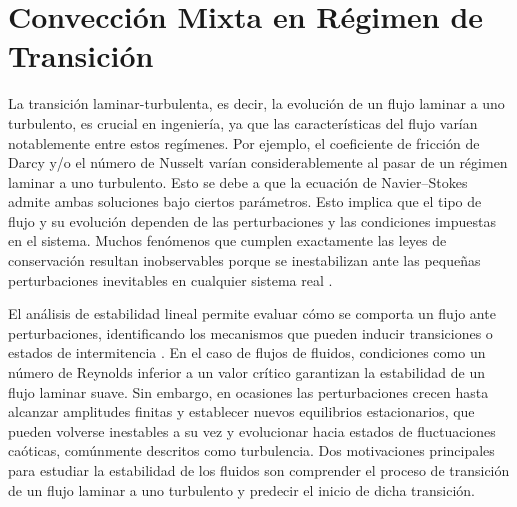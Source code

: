 \chapter{Convección Mixta en Régimen de Transición}




\newpage







La transición laminar-turbulenta, es decir, la evolución de un flujo laminar a uno turbulento, es crucial en ingeniería, ya que las características del flujo varían notablemente entre estos regímenes. Por ejemplo, el coeficiente de fricción de Darcy y/o el número de Nusselt varían considerablemente al pasar de un régimen laminar a uno turbulento. Esto se debe a que la ecuación de Navier–Stokes admite ambas soluciones bajo ciertos parámetros. Esto implica que el tipo de flujo y su evolución dependen de las perturbaciones y las condiciones impuestas en el sistema. Muchos fenómenos que cumplen exactamente las leyes de conservación resultan inobservables porque se inestabilizan ante las pequeñas perturbaciones inevitables en cualquier sistema real \cite{kundu}.

El análisis de estabilidad lineal permite evaluar cómo se comporta un flujo ante perturbaciones, identificando los mecanismos que pueden inducir transiciones o estados de intermitencia \cite{schmid}. En el caso de flujos de fluidos, condiciones como un número de Reynolds inferior a un valor crítico garantizan la estabilidad de un flujo laminar suave. Sin embargo, en ocasiones las perturbaciones crecen hasta alcanzar amplitudes finitas y establecer nuevos equilibrios estacionarios, que pueden volverse inestables a su vez y evolucionar hacia estados de fluctuaciones caóticas, comúnmente descritos como turbulencia. Dos motivaciones principales para estudiar la estabilidad de los fluidos son comprender el proceso de transición de un flujo laminar a uno turbulento y predecir el inicio de dicha transición.


